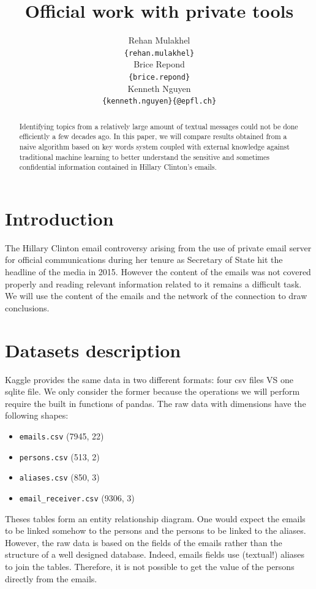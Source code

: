 \documentclass[11pt]{article}
\title{Official work with private tools}
\author{Rehan Mulakhel \\
  {\tt \{rehan.mulakhel\}} \\\And
  Brice Repond \\
  {\tt \{brice.repond\}} \\\And
  Kenneth Nguyen \\
{\tt \{kenneth.nguyen\}\{@epfl.ch\}} \\}
\date{}
\begin{document}
\maketitle
\begin{abstract}
Identifying topics from a relatively large amount of textual messages could not be done efficiently a few decades ago. In this paper, we will compare results obtained from a naive algorithm based on key words system coupled with external knowledge against traditional machine learning to better understand the sensitive and sometimes confidential information contained in Hillary Clinton's emails.
\end{abstract}

\section{Introduction}

The Hillary Clinton email controversy arising from the use of private email server for official communications during her tenure as Secretary of State hit the headline of the media in 2015. However the content of the emails was not covered properly and reading relevant information related to it remains a difficult task. We will use the content of the emails and the network of the connection to draw conclusions.

\section{Datasets description}

Kaggle provides the same data in two different formats: four csv files VS one sqlite file. We only consider the former because the operations we will perform require the built in functions of pandas. The raw data with dimensions have the following shapes:

\begin{itemize}
    \item \texttt{emails.csv} (7945, 22)
    \item \texttt{persons.csv} (513, 2)
    \item \texttt{aliases.csv} (850, 3)
    \item \texttt{email\_receiver.csv} (9306, 3)
\end{itemize}

Theses tables form an entity relationship diagram. One would expect the emails to be linked somehow to the persons and the persons to be linked to the aliases. However, the raw data is based on the fields of the emails rather than the structure of a well designed database. Indeed, emails fields use (textual!) aliases to join the tables. Therefore, it is not possible to get the value of the persons directly from the emails.
\end{document}
